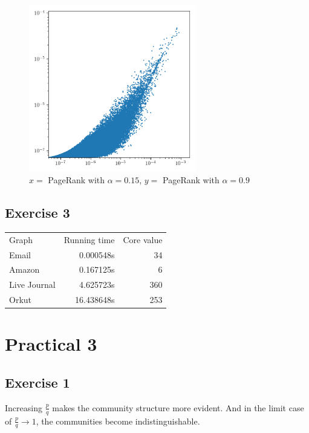 \documentclass{article}
\begin{document}
\begin{figure}[H]
    \centering
    \includegraphics[width=0.65\textwidth]{plots/6.png}
    \caption{$x =$ PageRank with $\alpha = 0.15$, $y = $ PageRank with $\alpha = 0.9$}
    \label{fig:6}
\end{figure}

\subsection*{Exercise 3}%
\label{sub:tp2ex3}
\begin{table}[!ht]
    \centering
    \begin{tabular}{lrr}
        Graph & Running time & Core value\\
        Email&
        0.000548s&
        34\\
        Amazon&
        0.167125s&
        6\\
        Live Journal&
        4.625723s&
        360\\
        Orkut&
        16.438648s&
        253
    \end{tabular}
\end{table}

\section*{Practical 3}%
\label{sec:tp3}
\subsection*{Exercise 1}%
\label{sub:tp3ex1}
Increasing $ \frac{p}{q} $ makes the community structure more evident.
And in the limit case of $ \frac{p}{q} \to 1 $, the communities become
indistinguishable.
\end{document}
